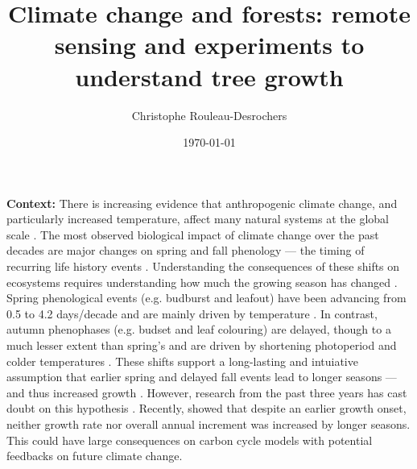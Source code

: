 \documentclass[12pt]{article}
\title{Climate change and forests: remote sensing and experiments to understand tree growth}
\date{\today}
\author{Christophe Rouleau-Desrochers}
\begin{document}

\maketitle


\textbf {Context:} There is increasing evidence that anthropogenic climate change, and particularly increased temperature, affect many natural systems at the global scale \citep{intergovernmental_panel_on_climate_change_detection_2014,parmesan_poleward_1999,rosenzweig_attributing_2008}. The most observed biological impact of climate change over the past decades are major changes on spring and fall phenology --- the timing of recurring life history events \citep{parmesan_globally_2003,parmesan_poleward_1999}. Understanding the consequences of these shifts on ecosystems requires understanding how much the growing season has changed \citep{duputie_phenological_2015}. Spring phenological events (e.g. budburst and leafout) have been advancing from 0.5 \citep{wolfe_climate_2005} to 4.2 days/decade \citep{chmielewski_response_2001,fu_recent_2014} and are mainly driven by temperature \citep{chuine_why_2010,cleland_shifting_2007,penuelas_responses_2001}. In contrast, autumn phenophases (e.g. budset and leaf colouring) are delayed, though to a much lesser extent than spring's \citep{gallinat_autumn_2015,jeong_macroscale_2014} and are driven by shortening photoperiod \citep{cooke_dynamic_2012,flynn_temperature_2018,korner_phenology_2010} and colder temperatures \citep{cooke_dynamic_2012,delpierre_temperate_2016}. These shifts support a long-lasting and intuiative assumption that earlier spring and delayed fall events lead to longer seasons ---and thus increased growth \citep{keenan_net_2014}. However, research from the past three years has cast doubt on this hypothesis \citep{dow_warm_2022,green_limits_2022,silvestro_longer_2023}. Recently, \citet{dow_warm_2022} showed that despite an earlier growth onset, neither growth rate nor overall annual increment was increased by longer seasons. This could have large consequences on carbon cycle models with potential feedbacks on future climate change.
\end{document}

